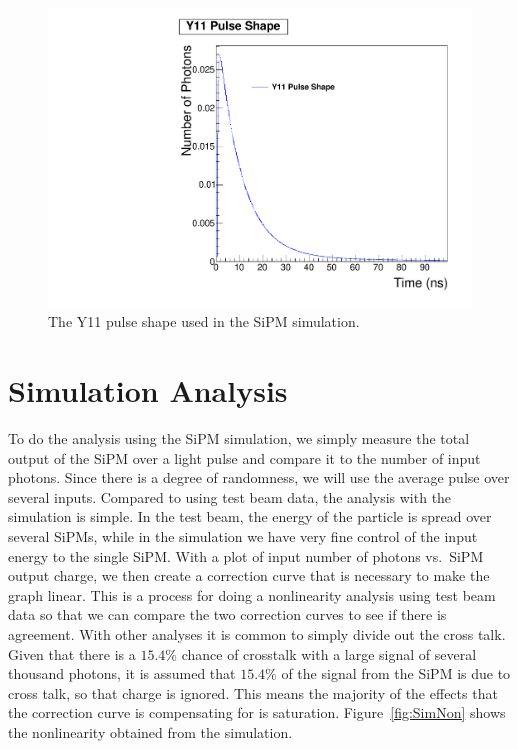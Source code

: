 \begin{figure}
\centering
\includegraphics[width=0.8\linewidth]{Figures/Y11.pdf}
\caption{The Y11 pulse shape used in the SiPM simulation.}
\label{fig:Y11}
\end{figure}

\section{Simulation Analysis}

To do the analysis using the SiPM simulation, we simply measure the total output of the SiPM over a light pulse and compare it to the number of input photons. Since there is a degree of randomness, we will use the average pulse over several inputs. Compared to using test beam data, the analysis with the simulation is simple. In the test beam, the energy of the particle is spread over several SiPMs, while in the simulation we have very fine control of the input energy to the single SiPM. With a plot of input number of photons vs.\ SiPM output charge, we then create a correction curve that is necessary to make the graph linear. This is a process for doing a nonlinearity analysis using test beam data so that we can compare the two correction curves to see if there is agreement. With other analyses it is common to simply divide out the cross talk. Given that there is a $15.4\%$ chance of crosstalk with a large signal of several thousand photons, it is assumed that $15.4\%$ of the signal from the SiPM is due to cross talk, so that charge is ignored. This means the majority of the effects that the correction curve is compensating for is saturation. Figure~\ref{fig:SimNon} shows the nonlinearity obtained from the simulation.

